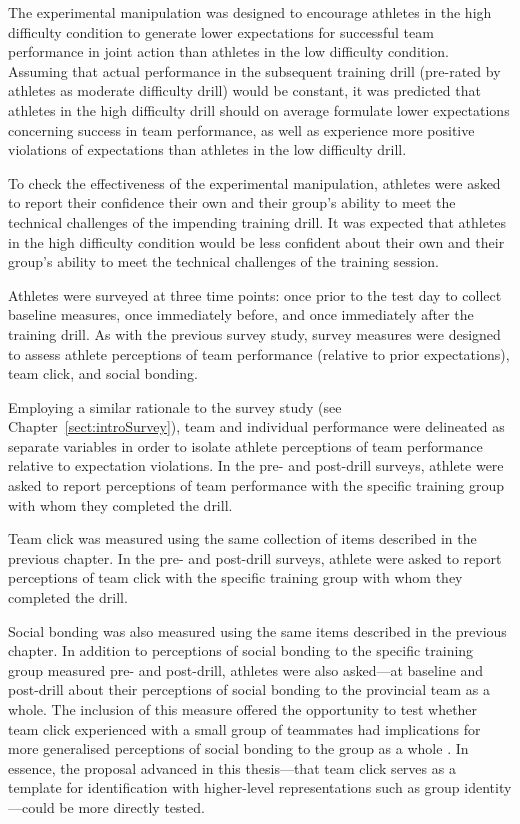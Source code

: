 The experimental manipulation was designed to encourage athletes in the high difficulty condition to generate lower expectations for successful team performance in joint action than athletes in the low difficulty condition. Assuming that actual performance in the subsequent training drill (pre-rated by athletes as moderate difficulty drill) would be constant, it was predicted that athletes in the high difficulty drill should on average formulate lower expectations concerning success in team performance, as well as experience more positive violations of expectations than athletes in the low difficulty drill.

To check the effectiveness of the experimental manipulation, athletes were asked to report their confidence their own and their group’s ability to meet the technical challenges of the impending training drill.  It was expected that athletes in the high difficulty condition would be less confident about their own and their group's ability to meet the technical challenges of the training session.

Athletes were surveyed at three time points: once prior to the test day to collect baseline measures, once immediately before, and once immediately after the training drill.  As with the previous survey study, survey measures were designed to assess athlete perceptions of team performance (relative to prior expectations), team click, and social bonding.

Employing a similar rationale to the survey study (see Chapter~\ref{sect:introSurvey}), team and individual performance were delineated as separate variables in order to isolate athlete perceptions of team performance relative to expectation violations.  In the pre- and post-drill surveys, athlete were asked to report perceptions of team performance with the specific training group with whom they completed the drill.

Team click was measured using the same collection of items described in the previous chapter.  In the pre- and post-drill surveys, athlete were asked to report perceptions of team click with the specific training group with whom they completed the drill.

Social bonding was also measured using the same items described in the previous chapter.  In addition to perceptions of social bonding to the specific training group measured pre- and post-drill, athletes were also asked—at baseline and post-drill about their perceptions of social bonding to the provincial team as a whole.  The inclusion of this measure offered the opportunity to test whether team click experienced with a small group of teammates had implications for more generalised perceptions of social bonding to the group as a whole \citep[see, for example][]{Reddish2013a}. In essence, the proposal advanced in this thesis---that team click serves as a template for identification with higher-level representations such as group identity---could be more directly tested.

